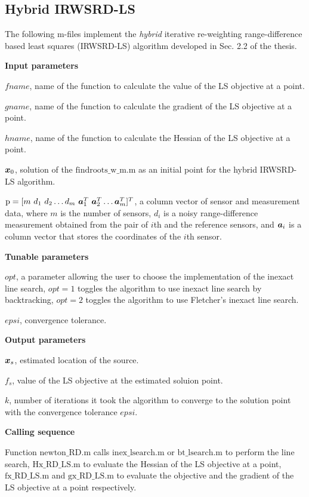 \subsection{Hybrid IRWSRD-LS}

The following m-files implement the \textit{hybrid} iterative re-weighting range-difference based least squares (IRWSRD-LS) algorithm developed in Sec. 2.2 of the thesis. 

\phantom{m}

\noindent
\textbf{Input parameters}

\noindent
$fname$, name of the function to calculate the value of the LS objective at a point.

\noindent
$gname$, name of the function to calculate the gradient of the LS objective at a point.

\noindent
$hname$, name of the function to calculate the Hessian of the LS objective at a point.


\noindent
$\mbox{\boldmath$x$}_0$, solution of the $\mbox{findroots\_w\_m.m}$ as an initial point for the hybrid IRWSRD-LS algorithm.


\noindent
$\mbox{p} = [m \ d_1 \ d_2 \ldots d_m \ \Ba_1^T \ \Ba_2^T \ldots \Ba_m^T]^T$, a column vector of sensor and measurement data, where $m$ is the number of sensors, $d_i$ is a noisy range-difference measurement obtained from the pair of $i$th and the reference sensors, and $\mbox{\boldmath$a$}_i$ is a column vector that stores the coordinates of the $i$th sensor.


\noindent
\textbf{Tunable parameters}

\noindent
$opt$, a parameter allowing the user to choose the implementation of the inexact line search, $opt = 1$ toggles the algorithm to use inexact line search by backtracking, $opt = 2$ toggles the algorithm to use Fletcher's inexact line search.

\noindent
$epsi$, convergence tolerance.

\noindent
\textbf{Output parameters}

\noindent
$\mbox{\boldmath$x$}_s$, estimated location of the source.

\noindent
$f_s$, value of the LS objective at the estimated soluion point.

\noindent
$k$, number of iterations it took the algorithm to  converge to the solution point with the convergence tolerance $epsi$.

\noindent
\textbf{Calling sequence}

\noindent
Function $\mbox{newton\_RD.m}$ calls $\mbox{inex\_lsearch.m}$ or $\mbox{bt\_lsearch.m}$ to perform the line search, $\mbox{Hx\_RD\_LS.m}$ to evaluate the Hessian of the LS objective at a point, $\mbox{fx\_RD\_LS.m}$ and $\mbox{gx\_RD\_LS.m}$ to evaluate the objective and the gradient of the LS objective at a point respectively.  

